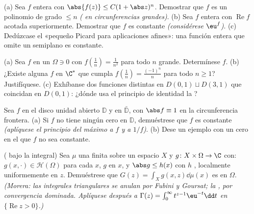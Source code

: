 \begin{exercise}[$\star\star$]\label{exo:b3:holomorphic:4}
(a) Sea $f$ entera con $\abs{f(z)} \leq C(1 + \abs
z)^{n}$. Demostrar que $f$ es un polinomio de grado $\leq n$
\emph{( en
circunferencias grandes)}. (b) Sea $f$ entera con $\operatorname{Re}f$
acotada superiormente. Demostrar que $f$ es constante \emph{(considérese
$\eu^{f}$)}. (c) Dedúzcase el «pequeño Picard para aplicaciones afines»:
una función entera que omite un semiplano es constante.
\end{exercise}

\begin{exercise}[$\star\star$]\label{exo:b3:holomorphic:5}
(a) Sea $f$  en un
 $\Omega \ni 0$ con
$f(\frac1n) = \frac1{n^2}$ para todo $n$ grande. Determínese $f$. (b)
¿Existe alguna  $f$ en $\C^*$
que cumpla $f(\frac1n) =
\frac{(-1)^n}{n}$ para todo $n \geq 1$? Justifíquese. (c) Exhíbanse dos
funciones  distintas en
$D(0,1)\sqcup D(3,1)$ que coincidan en $D(0,1)$: ¿dónde usa el principio
de identidad la ?
\end{exercise}

\begin{exercise}[$\star\star$]\label{exo:b3:holomorphic:6}
Sea $f$  en el disco unidad
abierto $\mathbb D$ y  en
$\bar{\mathbb D}$, con $\abs f \equiv 1$ en la circunferencia frontera.
(a) Si $f$ no tiene ningún cero en $\mathbb D$, demuéstrese que $f$ es
constante \emph{(aplíquese el principio del máximo a $f$ y a $1/f$)}.
(b) Dese un ejemplo con un cero en el que $f$ no sea constante.
\end{exercise}

\begin{exercise}[$\star\star$]\label{exo:b3:holomorphic:7}
( bajo la integral) Sea
$\mu$ una  finita sobre un
espacio $X$ y $g \colon X\times\Omega \to \C$ con:
$g(x, \cdot) \in \mathcal H(\Omega)$ para cada $x$, $g$
 en $x$, y
$\abs g \leq h(x)$ con $h$ ,
localmente uniformemente en $z$. Demuéstrese que
$G(z) = \int_Xg(x, z)\dd\mu(x)$ es
 en $\Omega$. \emph{(Morera:
las integrales triangulares se anulan por Fubini y Goursat; la
, por convergencia
dominada. Aplíquese después a $\Gamma(z) =
\int_0^\infty t^{z-1}\eu^{-t}\dd t$ en $\{\operatorname{Re}z >
0\}$.)}
\end{exercise}


